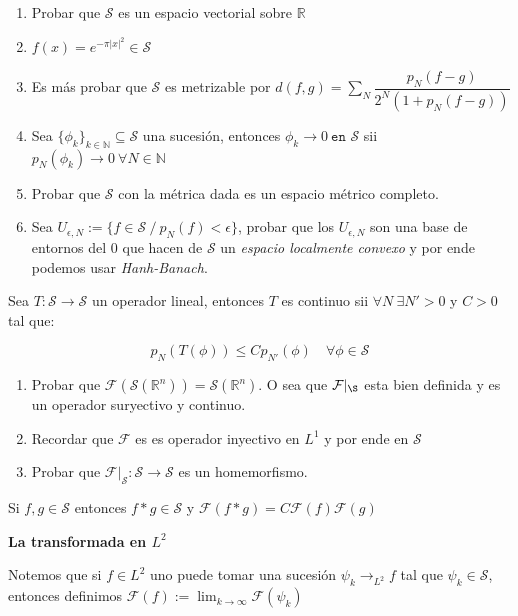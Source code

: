 \documentclass[11pt]{article}
\newcommand{\R}{{\mathbb{R}}}
\newcommand{\N}{{\mathbb{N}}}
\newenvironment{definition}[1][Definici\'on]{\begin{trivlist}
\item[\hskip \labelsep {\bfseries #1}]}{\end{trivlist}}
\newcommand{\F}{\mathcal{F}}
\newcommand{\Sw}{\mathcal{S}}
\begin{document}
\begin{enumerate}
\begin{enumerate}
\item Probar que $\Sw$ es un espacio vectorial sobre $\R$
\item $f(x)=e^{-\pi |x| ^2} \in \Sw $
\item Es m\'as probar que $\Sw$ es metrizable por $d(f,g) = \sum_{N}{\dfrac{p_N(f-g)}{2^{N}(1 + p_N(f-g)) }}$
\item Sea $\{ \phi_k \}_{k \in \N} \subseteq \Sw$ una sucesi\'on, entonces $\phi_k \rightarrow 0 \ \texttt{en $\Sw$}$ sii $p_N(\phi_k) \rightarrow 0 \ \forall N \in \N$
\item Probar que $\Sw$ con la m\'etrica dada es un espacio m\'etrico completo.
\item Sea $U_{\epsilon,N} := \{f \in \Sw \ / \ p_N(f) < \epsilon\}$, probar que los $U_{\epsilon,N}$ son una base de entornos del $0$ que hacen de $\Sw$ un \textit{espacio localmente convexo} y por ende podemos usar \textit{Hanh-Banach}.


\end{enumerate}

\item Sea $T:\Sw \rightarrow \Sw$ un operador lineal, entonces $T$ es continuo sii $\forall N \ \exists N' > 0$ y $C > 0$ tal que:

$$p_N(T(\phi)) \leq Cp_{N'}(\phi) \quad \forall \phi \in \Sw$$

\item 

\begin{enumerate}
\item Probar que $\F(\Sw(\R^n)) = \Sw(\R^n)$. O sea que $\F|_{\S}$ esta bien definida y es un operador suryectivo y continuo.
\item Recordar que $\F$ es es operador inyectivo en $L^1$ y por ende en $\Sw$
\item Probar que $\F|_{\Sw} : \Sw \rightarrow \Sw$ es un homemorfismo.

\end{enumerate}

\item Si $f,g \in \Sw$ entonces $f*g \in \Sw$ y $\F(f*g)=C\F(f)\F(g)$

\bigskip

\textbf{La transformada en $L^2$}

\begin{definition}

Notemos que si $f \in L^2$ uno puede tomar una sucesi\'on $\psi_k \rightarrow_{L^2} f$ tal que $\psi_k \in \Sw$, entonces definimos $\F(f) := \lim_{k \rightarrow \infty}{\F(\psi_k)}$


\end{definition}
\end{enumerate}
\end{document}
